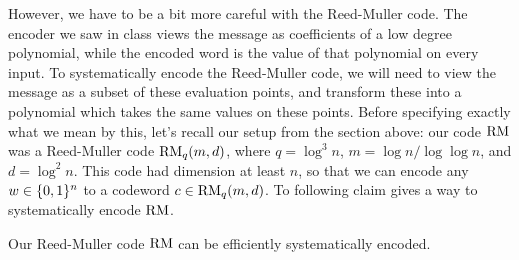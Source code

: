 \documentclass[11pt]{article}
\begin{document}
However, we have to be a bit more careful with the Reed-Muller code. The encoder we saw in class views the message as coefficients of a low degree polynomial, while the encoded word is the value of that polynomial on every input. To systematically encode the Reed-Muller code, we will need to view the message as a subset of these evaluation points, and transform these into a polynomial which takes the same values on these points. Before specifying exactly what we mean by this, let's recall our setup from the section above: our code $\mathrm{RM}$ was a Reed-Muller code $\mathrm{RM}_q(m, d)$, where $q = \log^3 n$, $m = \log n / \log \log n$, and $d = \log^2 n$. This code had dimension at least $n$, so that we can encode any $w \in \{0, 1\}^n$ to a codeword $c \in \mathrm{RM}_q(m, d)$. To following claim gives a way to systematically encode $\mathrm{RM}$.

\begin{claim}{2.5}
    Our Reed-Muller code $\mathrm{RM}$ can be efficiently systematically encoded.
\end{claim}
\end{document}
